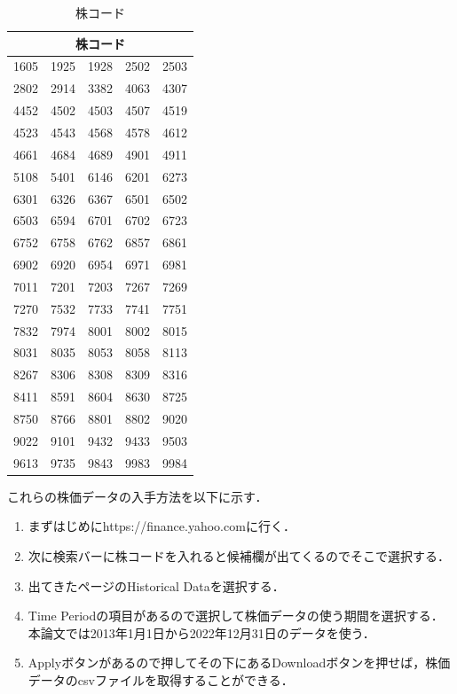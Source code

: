 \begin{table}[htbp]
  \centering
  \caption{株コード}
  \label{data}
  \begin{tabular}{|l|l|l|l|l|}
  \hline
  \multicolumn{5}{|c|}{\textbf{株コード}} \\
  \hline
  
  1605 & 1925 & 1928 & 2502 & 2503 \\
  \hline
  2802 & 2914 & 3382 & 4063 & 4307 \\
  \hline
  4452 & 4502 & 4503 & 4507 & 4519 \\
  \hline
  4523 & 4543 & 4568 & 4578 & 4612 \\
  \hline
  4661 & 4684 & 4689 & 4901 & 4911 \\
  \hline
  5108 & 5401 & 6146 & 6201 & 6273 \\
  \hline
  6301 & 6326 & 6367 & 6501 & 6502 \\
  \hline
  6503 & 6594 & 6701 & 6702 & 6723 \\
  \hline
  6752 & 6758 & 6762 & 6857 & 6861 \\
  \hline
  6902 & 6920 & 6954 & 6971 & 6981 \\
  \hline
  7011 & 7201 & 7203 & 7267 & 7269 \\
  \hline
  7270 & 7532 & 7733 & 7741 & 7751 \\
  \hline
  7832 & 7974 & 8001 & 8002 & 8015 \\
  \hline
  8031 & 8035 & 8053 & 8058 & 8113 \\
  \hline
  8267 & 8306 & 8308 & 8309 & 8316 \\
  \hline
  8411 & 8591 & 8604 & 8630 & 8725 \\
  \hline
  8750 & 8766 & 8801 & 8802 & 9020 \\
  \hline
  9022 & 9101 & 9432 & 9433 & 9503 \\
  \hline
  9613 & 9735 & 9843 & 9983 & 9984 \\
  \hline
  \end{tabular}
\end{table}

これらの株価データの入手方法を以下に示す．
\begin{enumerate}
 \item まずはじめにhttps://finance.yahoo.comに行く．
 \item 次に検索バーに株コードを入れると候補欄が出てくるのでそこで選択する．
 \item 出てきたページのHistorical Dataを選択する．
 \item Time Periodの項目があるので選択して株価データの使う期間を選択する．本論文では2013年1月1日から2022年12月31日のデータを使う．
 \item Applyボタンがあるので押してその下にあるDownloadボタンを押せば，株価データのcsvファイルを取得することができる．
\end{enumerate}

